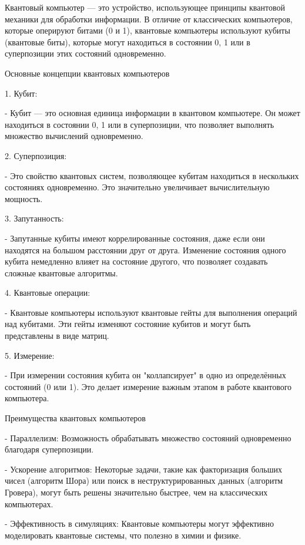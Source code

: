 \documentclass[exam_answers.tex]{subfiles}
\begin{document}
\renewcommand{\baselinestretch}{\blch}

Квантовый компьютер — это устройство, использующее принципы квантовой механики для обработки информации.
В отличие от классических компьютеров, которые оперируют битами (0 и 1), квантовые компьютеры используют кубиты (квантовые биты), которые могут находиться в состоянии 0, 1 или в суперпозиции этих состояний одновременно.

Основные концепции квантовых компьютеров

1. Кубит:

   - Кубит — это основная единица информации в квантовом компьютере. Он может находиться в состоянии 0, 1 или в суперпозиции, что позволяет выполнять множество вычислений одновременно.

2. Суперпозиция:

   - Это свойство квантовых систем, позволяющее кубитам находиться в нескольких состояниях одновременно. Это значительно увеличивает вычислительную мощность.

3. Запутанность:

   - Запутанные кубиты имеют коррелированные состояния, даже если они находятся на большом расстоянии друг от друга. Изменение состояния одного кубита немедленно влияет на состояние другого, что позволяет создавать сложные квантовые алгоритмы.

4. Квантовые операции:

   - Квантовые компьютеры используют квантовые гейты для выполнения операций над кубитами. Эти гейты изменяют состояние кубитов и могут быть представлены в виде матриц.

5. Измерение:

   - При измерении состояния кубита он "коллапсирует" в одно из определённых состояний (0 или 1). Это делает измерение важным этапом в работе квантового компьютера.

Преимущества квантовых компьютеров

- Параллелизм: Возможность обрабатывать множество состояний одновременно благодаря суперпозиции.

- Ускорение алгоритмов: Некоторые задачи, такие как факторизация больших чисел (алгоритм Шора) или поиск в неструктурированных данных (алгоритм Гровера), могут быть решены значительно быстрее, чем на классических компьютерах.

- Эффективность в симуляциях: Квантовые компьютеры могут эффективно моделировать квантовые системы, что полезно в химии и физике.
\end{document}
